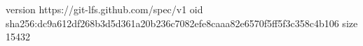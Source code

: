 version https://git-lfs.github.com/spec/v1
oid sha256:dc9a612df268b3d5d361a20b236c7082efe8caaa82e6570f5ff5f3c358c4b106
size 15432
